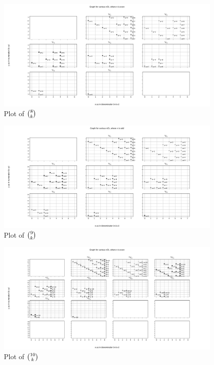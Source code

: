 \documentclass[PermutationsCombinationsWhyWholeNumber.tex]{subfiles}
\begin{document}
\begin{appendices}
\begin{figure}[ph!]
	\label{7Ck}
\end{figure}
\begin{figure}[ph!]	
	\includegraphics[width=\linewidth]{8Ck.png}
	\caption{Plot of $\binom{8}{k}$}
	\label{8Ck}
\end{figure}
\begin{figure}[ph!]	
	\includegraphics[width=\linewidth]{9Ck.png}
	\caption{Plot of $\binom{9}{k}$}
	\label{9Ck}
\end{figure}
\begin{figure}[ph!]	
	\includegraphics[width=\linewidth]{10Ck.png}
	\caption{Plot of $\binom{10}{k}$}
	\label{10Ck}
\end{figure}	

\end{appendices}
\end{document}
